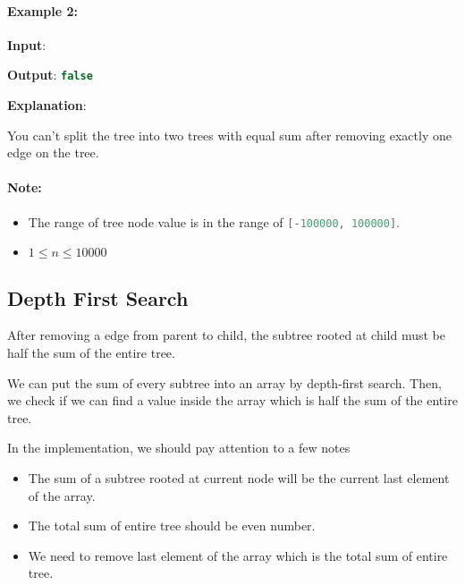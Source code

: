 \paragraph{Example 2:}
\begin{flushleft}


\textbf{Input}:     
\begin{figure}[H]
\end{figure}

\textbf{Output}:  \lstinline[language=C++, basicstyle=\small\ttfamily, keywordstyle=\bfseries\color{green!40!black}]|false|

\textbf{Explanation}: 

You can't split the tree into two trees with equal sum after removing exactly one edge on the tree.
\end{flushleft}

\paragraph{Note:}

\begin{itemize}
\item The range of tree node value is in the range of  \lstinline[language=C++, basicstyle=\small\ttfamily, keywordstyle=\bfseries\color{green!40!black}]|[-100000, 100000]|.
\item $1 \leq n \leq 10000$
\end{itemize}

\subsection{Depth First Search}
After removing a edge from parent to child, the subtree rooted at child must be half the sum of the entire tree.

We can put the sum of every subtree into an array by depth-first search. Then, we check if we can find a value inside the array which is half the sum of the entire tree.

In the implementation, we should pay attention to a few notes
\begin{itemize}
\item The sum of a subtree rooted at current node will be the current last element of the array.
\item The total sum of entire tree should be even number.
\item We need to remove last element of the array which is the total sum of entire tree. 
\end{itemize}
